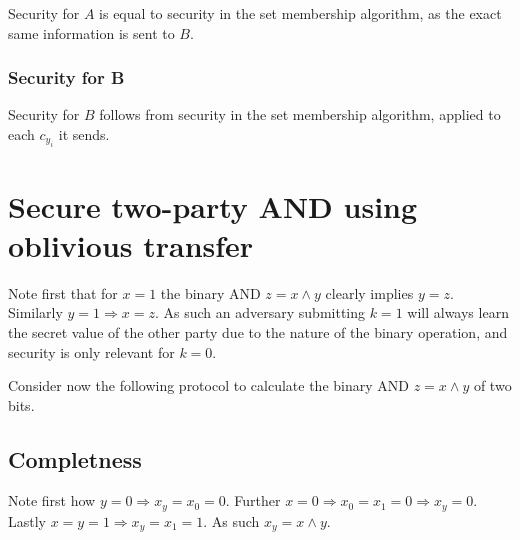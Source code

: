 \documentclass[a4paper]{scrreprt}
\begin{document}
Security for $A$ is equal to security in the set membership algorithm, as the
exact same information is sent to $B$.

\subsubsection{Security for B}

Security for $B$ follows from security in the set membership algorithm, applied
to each $c_{y_i}$ it sends.

\section{Secure two-party AND using oblivious transfer}

Note first that for $x = 1$ the binary AND $z = x \land y$ clearly implies
$y = z$. Similarly $y = 1 \Rightarrow x = z$. As such an adversary submitting
$k = 1$ will always learn the secret value of the other party due to the nature
of the binary operation, and security is only relevant for $k = 0$.

Consider now the following protocol to calculate the binary AND $z = x \land y$
of two bits.


\subsection{Completness}

Note first how $y = 0 \Rightarrow x_y = x_0 = 0$. Further $x = 0 \Rightarrow
x_0 = x_1 = 0 \Rightarrow x_y = 0$. Lastly $x = y = 1 \Rightarrow x_y = x_1 =
1$. As such $x_y = x \land y$.
\end{document}
